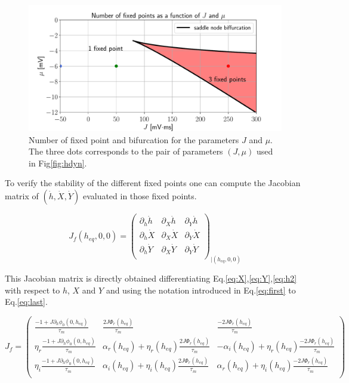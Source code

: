 \documentclass[12pt,twoside]{report}
\begin{document}
\begin{figure}[h!]
	\centering
	\includegraphics[width=0.8\linewidth]{phase_plan.pdf}
	\caption{Number of fixed point and bifurcation for the parameters $J$ and $\mu$. The three dots corresponds to the pair of parameters $(J,\mu)$ used in Fig\ref{fig:hdyn}.
	}
	\label{fig:phase_plan}
\end{figure}


To verify the stability of the different fixed points one can compute the Jacobian matrix of $(\dot{h},\dot{X},\dot{Y})$ evaluated in those fixed points.

\begin{equation}
J_f(h_{eq},0,0)=
\begin{pmatrix}
\partial_h \dot{h}  & \partial_X \dot{h} & \partial_Y \dot{h}  \\
\partial_h \dot{X}  & \partial_X \dot{X} & \partial_Y \dot{X}  \\
\partial_h \dot{Y}  & \partial_X \dot{Y} & \partial_Y \dot{Y}  \\
\end{pmatrix}_{|(h_{eq},0,0)}
\end{equation}

This Jacobian matrix is directly obtained differentiating  Eq.\eqref{eq:X},\eqref{eq:Y},\eqref{eq:h2} with respect to $h$, $X$ and $Y$ and using the notation introduced in Eq.\eqref{eq:first} to Eq.\eqref{eq:last}.

\begin{equation}
\label{eq:jf}
J_f=
\begin{pmatrix}
\frac{-1+J\partial_h\phi_0(0,h_{eq})}{\tau_m} & \frac{2J\Phi_r(h_{eq})}{\tau_m} & \frac{-2J\Phi_r(h_{eq})}{\tau_m}  \\
\eta_r\frac{-1+J\partial_h\phi_0(0,h_{eq})}{\tau_m} &\alpha_r(h_{eq})+\eta_r(h_{eq}) \frac{2J\Phi_r(h_{eq})}{\tau_m} & -\alpha_i(h_{eq})+\eta_r(h_{eq})\frac{-2J\Phi_r(h_{eq})}{\tau_m}  \\
\eta_i\frac{-1+J\partial_h\phi_0(0,h_{eq})}{\tau_m} &\alpha_i(h_{eq})+\eta_i(h_{eq}) \frac{2J\Phi_r(h_{eq})}{\tau_m} & \alpha_r(h_{eq})+\eta_i(h_{eq})\frac{-2J\Phi_r(h_{eq})}{\tau_m}  \\
\end{pmatrix}
\end{equation}
\end{document}
